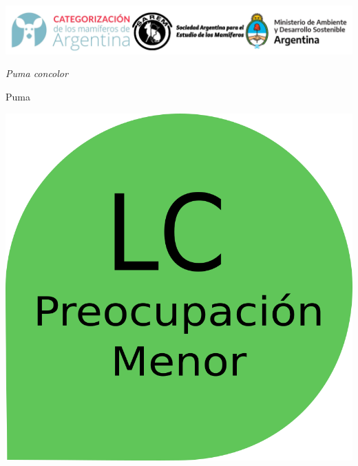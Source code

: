 \documentclass[
  x11names]{article}
\author{}
\date{\vspace{-2.5em}Fecha de creación: 06 April, 2023}
\begin{document}
\renewenvironment{framed}[1][\hsize]
  {\MakeFramed{\hsize#1\advance\hsize-\width \FrameRestore}}%
  {\endMakeFramed}

\setmainfont{Arial}
\setsansfont{Arial}
\setmonofont{Arial}

\newcommand\invisiblesection[1]{%
  \refstepcounter{section}%
  \addcontentsline{toc}{section}{\protect\numberline{\thesection}#1}%
  \sectionmark{#1}}


%
\vspace{-0.4cm}

\includegraphics[width=1\linewidth]{images/Base_info/logo}

\vspace{1cm}

\begin{minipage}{0.7\textwidth}
\vspace{0.3cm}
\fontsize{20}{24}\selectfont\textit{Puma concolor}

\vspace{0.3cm}
\fontsize{30}{36}\selectfont Puma
\end{minipage}
\hspace{0.05\textwidth}
\begin{minipage}{0.25\textwidth}
\includegraphics[width=\textwidth]{images/lc.png}
\end{minipage}
\end{document}
